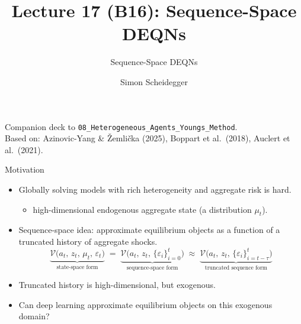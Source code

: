 \documentclass[aspectratio=169,11pt]{beamer}
\title[Lecture 17 (B16)]{Lecture 17 (B16): Sequence-Space DEQNs}
\subtitle{Sequence-Space DEQNs}
\author{Simon Scheidegger}
\institute{HEC, University of Lausanne}
\date{}
\newcommand{\emphc}[1]{\textcolor{harvardcrimson}{#1}}
\begin{document}
{
\begin{frame}
\titlepage
\vspace{-0.4cm}
\begin{center}
{\footnotesize Companion deck to \texttt{08\_Heterogeneous\_Agents\_Youngs\_Method}.}\\[4pt]
{\footnotesize Based on: Azinovic-Yang \& \v{Z}emli\v{c}ka (2025), Boppart et al.\ (2018), Auclert et al.\ (2021).}
\end{center}
\end{frame}
}


\begin{frame}{Motivation}
\small
\begin{itemize}\itemsep6pt
\item Globally solving models with rich \emphc{heterogeneity} and \emphc{aggregate risk} is hard.
    \begin{itemize}
        \item[$\rightarrow$] high-dimensional \emphc{endogenous} aggregate state (a distribution $\mu_t$).
    \end{itemize}

\item \emphc{Sequence-space idea:} approximate equilibrium objects as a function of a \emphc{truncated history of aggregate shocks}.
\[
\underbrace{\mathcal{V}\bigl(a_t,\, z_t,\, \mu_t,\, \varepsilon_t\bigr)}_{\text{state-space form}}
\;=\;
\underbrace{\mathcal{V}\bigl(a_t,\, z_t,\, \{\varepsilon_i\}_{i=0}^{t}\bigr)}_{\text{sequence-space form}}
\;\approx\;
\underbrace{\mathcal{V}\bigl(a_t,\, z_t,\, \{\varepsilon_i\}_{i=t-\tau}^{t}\bigr)}_{\text{truncated sequence form}}
\]

\item Truncated history is high-dimensional, but \emphc{exogenous}.
\item Can deep learning approximate equilibrium objects on this exogenous domain?
\end{itemize}
\end{frame}
\end{document}
